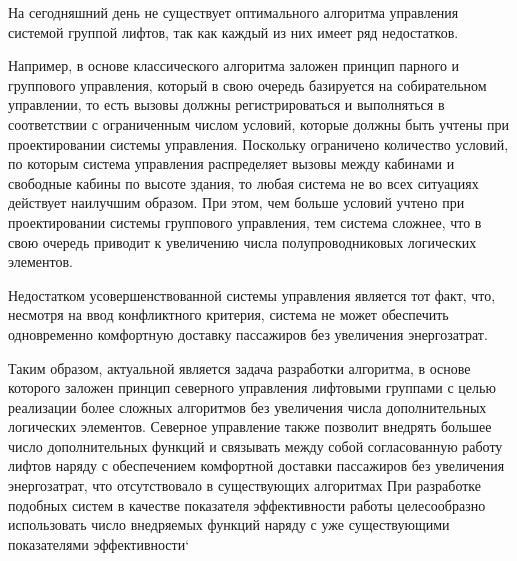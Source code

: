 	На сегодняшний день не существует оптимального алгоритма управления системой группой лифтов, так как каждый из них имеет ряд недостатков.

	Например, в основе классического алгоритма заложен принцип парного и группового управления, который в свою очередь базируется на собирательном управлении,
		то есть вызовы должны регистрироваться и выполняться в соответствии с ограниченным числом условий, которые должны быть учтены при проектировании
		системы управления. Поскольку ограничено количество условий, по которым система управления распределяет вызовы между кабинами
		и свободные кабины по высоте здания, то любая система не во всех ситуациях действует наилучшим образом.
		При этом, чем больше условий учтено при проектировании системы группового управления, тем система сложнее,
		что в свою очередь приводит к увеличению числа полупроводниковых логических элементов.

	Недостатком усовершенствованной системы управления является тот факт, что, несмотря на ввод конфликтного критерия,
		система не может обеспечить одновременно комфортную доставку пассажиров без увеличения энергозатрат.

	Таким образом, актуальной является задача разработки алгоритма, в основе которого заложен принцип северного управления лифтовыми группами с целью реализации
		более сложных алгоритмов без увеличения числа дополнительных логических элементов. Северное управление также позволит внедрять большее число
		дополнительных функций и связывать между собой согласованную работу лифтов наряду с обеспечением комфортной доставки пассажиров без увеличения энергозатрат,
		что отсутствовало в существующих алгоритмах При разработке подобных систем в качестве показателя эффективности работы целесообразно использовать
		число внедряемых функций наряду с уже существующими показателями эффективности`

